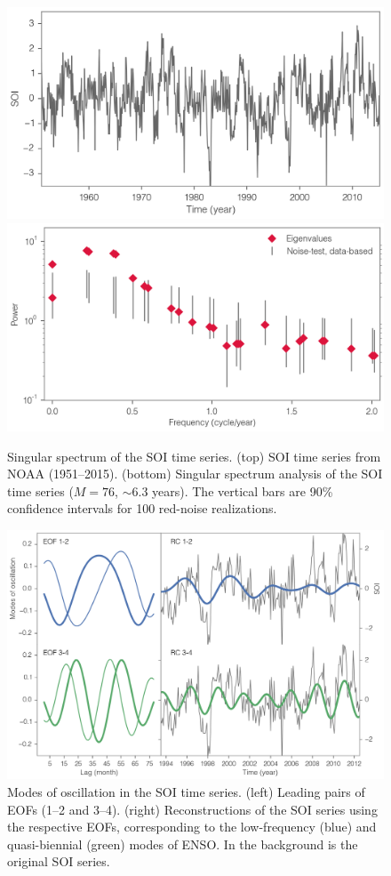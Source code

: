 \begin{figure}[!ht]
  \centering
  \includegraphics[width=.72\textwidth]{img/soi_time_series.png}\\
  \includegraphics[width=.72\textwidth]{img/ssa_spec_soi.png}
  \caption[Singular spectrum of the SOI time series]{
  \ssp \footnotesize
  Singular spectrum of the SOI time series. (top) SOI time series from NOAA (1951--2015). (bottom) Singular spectrum analysis of the SOI time series ($M = 76$, $\sim$6.3 years). The vertical bars are 90\% confidence intervals for 100 red-noise realizations.
  }
  \label{c4f6}
\end{figure}


\begin{figure}[!ht]
  \centering
  \includegraphics[width=\textwidth]{img/ssa_eof_rc_v3.png}
  \caption[Modes of oscillation in the SOI time series]{
  \ssp \footnotesize
  Modes of oscillation in the SOI time series. (left) Leading pairs of EOFs (1--2 and 3--4). (right) Reconstructions of the SOI series using the respective EOFs, corresponding to the low-frequency (blue) and quasi-biennial (green) modes of ENSO. In the background is the original SOI series.
  }
  \label{c4f7}
\end{figure}


